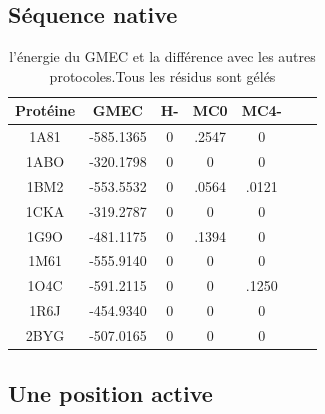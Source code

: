 \documentclass[a4paper,12pt]{article}
\begin{document}
   \subsection{Séquence native}


    \begin{table}[!htbp]
      \centering

      \begin{tabular}{|c|c|c|c|c|c|c|}

        \hline
        Protéine & GMEC & H- & MC0 & MC4- \\
        \hline
        1A81 & -585.1365 & 0 & .2547 & 0 \\
        1ABO & -320.1798 & 0 & 0 & 0 \\
        1BM2 & -553.5532 & 0 & .0564 & .0121 \\
        1CKA & -319.2787 & 0 & 0 & 0 \\
        1G9O & -481.1175 & 0 & .1394 & 0 \\
        1M61 & -555.9140 & 0 & 0 & 0 \\
        1O4C & -591.2115 & 0 & 0 & .1250 \\
        1R6J & -454.9340 & 0 & 0 & 0 \\
        2BYG & -507.0165 & 0 & 0 & 0 \\        
        \hline


      \end{tabular}      
      \caption{l'énergie du GMEC et la différence avec les autres protocoles.Tous les résidus sont gélés}
      \label{tab_best_ener_no_active}      
    \end{table}


   \subsection{ Une position active}
\end{document}
